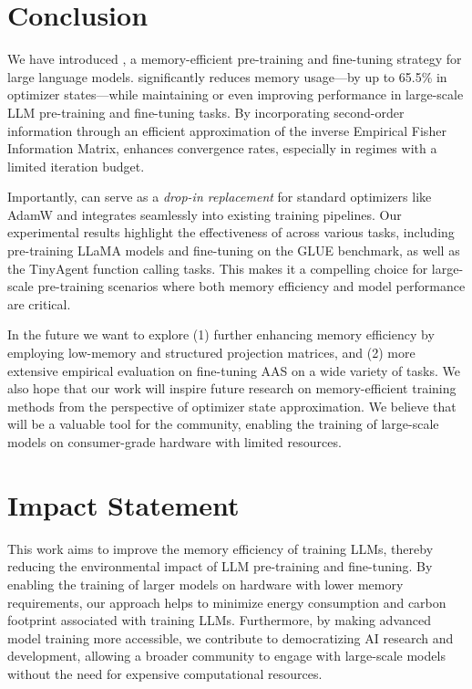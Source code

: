 \section{Conclusion}

We have introduced \textit{\lowrank}, a memory-efficient pre-training and fine-tuning strategy for large language models. \textit{\lowrank} significantly reduces memory usage—by up to 65.5\% in optimizer states—while maintaining or even improving performance in large-scale LLM pre-training and fine-tuning tasks. By incorporating second-order information through an efficient approximation of the inverse Empirical Fisher Information Matrix, \textit{\lowrank} enhances convergence rates, especially in regimes with a limited iteration budget.

Importantly, \textit{\lowrank} can serve as a \emph{drop-in replacement} for standard optimizers like AdamW and integrates seamlessly into existing training pipelines. Our experimental results highlight the effectiveness of \textit{\lowrank} across various tasks, including pre-training LLaMA models and fine-tuning on the GLUE benchmark, as well as the TinyAgent function calling tasks. This makes it a compelling choice for large-scale pre-training scenarios where both memory efficiency and model performance are critical.

In the future we want to explore (1) further enhancing memory efficiency by employing low-memory and structured projection matrices, and (2) more extensive empirical evaluation on fine-tuning AAS on a wide variety of tasks. We also hope that our work will inspire future research on memory-efficient training methods from the perspective of optimizer state approximation. We believe that \textit{\lowrank} will be a valuable tool for the community, enabling the training of large-scale models on consumer-grade hardware with limited resources.

\section*{Impact Statement}

This work aims to improve the memory efficiency of training LLMs, thereby reducing the environmental impact of LLM pre-training and fine-tuning. By enabling the training of larger models on hardware with lower memory requirements, our approach helps to minimize energy consumption and carbon footprint associated with training LLMs. Furthermore, by making advanced model training more accessible, we contribute to democratizing AI research and development, allowing a broader community to engage with large-scale models without the need for expensive computational resources.